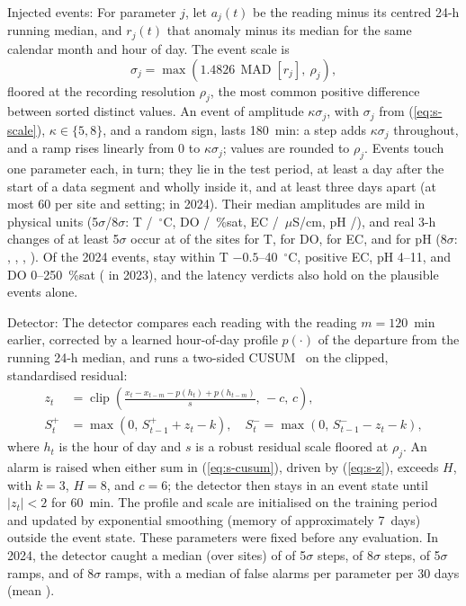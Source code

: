\documentclass[journal]{IEEEtran}
\begin{document}
Injected events: For parameter $j$, let $a_j(t)$ be the reading minus its centred 24-h running median, and $r_j(t)$ that anomaly minus its median for the same calendar month and hour of day. The event scale is
\begin{equation}
\sigma_j=\max\left(1.4826\,\operatorname{MAD}\!\left[r_j\right],\ \rho_j\right),
\label{eq:s-scale}
\end{equation}
floored at the recording resolution $\rho_j$, the most common positive difference between sorted distinct values. An event of amplitude $\kappa\sigma_j$, with $\sigma_j$ from (\ref{eq:s-scale}), $\kappa\in\{5,8\}$, and a random sign, lasts 180~min: a step adds $\kappa\sigma_j$ throughout, and a ramp rises linearly from 0 to $\kappa\sigma_j$; values are rounded to $\rho_j$. Events touch one parameter each, in turn; they lie in the test period, at least a day after the start of a data segment and wholly inside it, and at least three days apart (at most 60 per site and setting; \designEventsConf{} in 2024). Their median amplitudes are mild in physical units (5$\sigma$/8$\sigma$: T \ampFiveT/\ampEightT~$^\circ$C, DO \ampFiveDO/\ampEightDO~\%sat, EC \ampFiveEC/\ampEightEC~$\mu$S/cm, pH \ampFivePh/\ampEightPh), and real 3-h changes of at least 5$\sigma$ occur at \realFiveT{} of the sites for T, \realFiveDO{} for DO, \realFiveEC{} for EC, and \realFivePh{} for pH (8$\sigma$: \realEightT, \realEightDO, \realEightEC, \realEightPh). Of the 2024 events, \plausibleConf{} stay within T $-0.5$--40~$^\circ$C, positive EC, pH 4--11, and DO 0--250~\%sat (\plausibleDev{} in 2023), and the latency verdicts also hold on the plausible events alone.

Detector: The detector compares each reading with the reading $m=120$~min earlier, corrected by a learned hour-of-day profile $p(\cdot)$ of the departure from the running 24-h median, and runs a two-sided CUSUM~\cite{page1954continuous} on the clipped, standardised residual:
\begin{align}
z_t&=\operatorname{clip}\!\left(\frac{x_t-x_{t-m}-p(h_t)+p(h_{t-m})}{s},\,-c,\,c\right),\label{eq:s-z}\\
S^{+}_t&=\max\left(0,\,S^{+}_{t-1}+z_t-k\right),\quad S^{-}_t=\max\left(0,\,S^{-}_{t-1}-z_t-k\right),\label{eq:s-cusum}
\end{align}
where $h_t$ is the hour of day and $s$ is a robust residual scale floored at $\rho_j$. An alarm is raised when either sum in (\ref{eq:s-cusum}), driven by (\ref{eq:s-z}), exceeds $H$, with $k=3$, $H=8$, and $c=6$; the detector then stays in an event state until $|z_t|<2$ for 60~min. The profile and scale are initialised on the training period and updated by exponential smoothing (memory of approximately 7~days) outside the event state. These parameters were fixed before any evaluation. In 2024, the detector caught a median (over sites) of \detectStepFive{} of 5$\sigma$ steps, \detectStepEight{} of 8$\sigma$ steps, \detectRampFive{} of 5$\sigma$ ramps, and \detectRampEight{} of 8$\sigma$ ramps, with a median of \faMedian{} false alarms per parameter per 30 days (mean \faMean).
\end{document}
